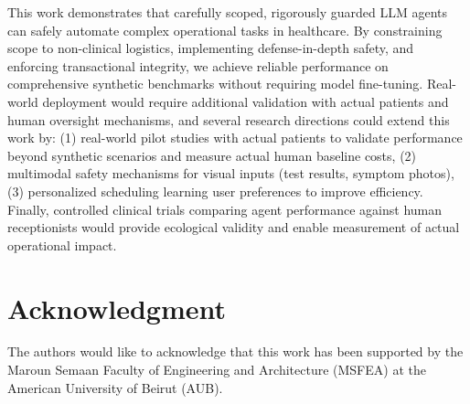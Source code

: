 \documentclass[conference]{IEEEtran}
\begin{document}
This work demonstrates that carefully scoped, rigorously guarded LLM agents can safely automate complex operational tasks in healthcare. By constraining scope to non-clinical logistics, implementing defense-in-depth safety, and enforcing transactional integrity, we achieve reliable performance on comprehensive synthetic benchmarks without requiring model fine-tuning. Real-world deployment would require additional validation with actual patients and human oversight mechanisms, and several research directions could extend this work by: (1) real-world pilot studies with actual patients to validate performance beyond synthetic scenarios and measure actual human baseline costs, (2) multimodal safety mechanisms for visual inputs (test results, symptom photos), (3) personalized scheduling learning user preferences to improve efficiency. Finally, controlled clinical trials comparing agent performance against human receptionists would provide ecological validity and enable measurement of actual operational impact.

\section*{Acknowledgment}
The authors would like to acknowledge that this work has been supported by the Maroun Semaan Faculty of Engineering and Architecture (MSFEA) at the American University of Beirut (AUB).



\end{document}
